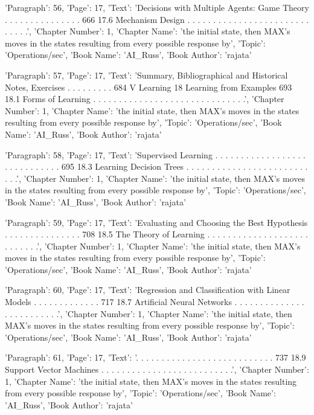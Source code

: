 {'Paragraph': 56, 'Page': 17, 'Text': 'Decisions with Multiple Agents: Game Theory . . . . . . . . . . . . . . . 666 17.6 Mechanism Design . . . . . . . . . . . . . . . . . . . . . . . . . . . . .', 'Chapter Number': 1, 'Chapter Name': 'the initial state, then MAX’s moves in the states resulting from every possible response by', 'Topic': 'Operations/sec', 'Book Name': 'AI_Russ', 'Book Author': 'rajata'}

{'Paragraph': 57, 'Page': 17, 'Text': 'Summary, Bibliographical and Historical Notes, Exercises . . . . . . . . . 684 V Learning 18 Learning from Examples 693 18.1 Forms of Learning . . . . . . . . . . . . . . . . . . . . . . . . . . . . . .', 'Chapter Number': 1, 'Chapter Name': 'the initial state, then MAX’s moves in the states resulting from every possible response by', 'Topic': 'Operations/sec', 'Book Name': 'AI_Russ', 'Book Author': 'rajata'}

{'Paragraph': 58, 'Page': 17, 'Text': 'Supervised Learning . . . . . . . . . . . . . . . . . . . . . . . . . . . . . 695 18.3 Learning Decision Trees . . . . . . . . . . . . . . . . . . . . . . . . . . .', 'Chapter Number': 1, 'Chapter Name': 'the initial state, then MAX’s moves in the states resulting from every possible response by', 'Topic': 'Operations/sec', 'Book Name': 'AI_Russ', 'Book Author': 'rajata'}

{'Paragraph': 59, 'Page': 17, 'Text': 'Evaluating and Choosing the Best Hypothesis . . . . . . . . . . . . . . . 708 18.5 The Theory of Learning . . . . . . . . . . . . . . . . . . . . . . . . . . .', 'Chapter Number': 1, 'Chapter Name': 'the initial state, then MAX’s moves in the states resulting from every possible response by', 'Topic': 'Operations/sec', 'Book Name': 'AI_Russ', 'Book Author': 'rajata'}

{'Paragraph': 60, 'Page': 17, 'Text': 'Regression and Classiﬁcation with Linear Models . . . . . . . . . . . . . 717 18.7 Artiﬁcial Neural Networks . . . . . . . . . . . . . . . . . . . . . . . . .', 'Chapter Number': 1, 'Chapter Name': 'the initial state, then MAX’s moves in the states resulting from every possible response by', 'Topic': 'Operations/sec', 'Book Name': 'AI_Russ', 'Book Author': 'rajata'}

{'Paragraph': 61, 'Page': 17, 'Text': '. . . . . . . . . . . . . . . . . . . . . . . . . . . 737 18.9 Support Vector Machines . . . . . . . . . . . . . . . . . . . . . . . . . .', 'Chapter Number': 1, 'Chapter Name': 'the initial state, then MAX’s moves in the states resulting from every possible response by', 'Topic': 'Operations/sec', 'Book Name': 'AI_Russ', 'Book Author': 'rajata'}

